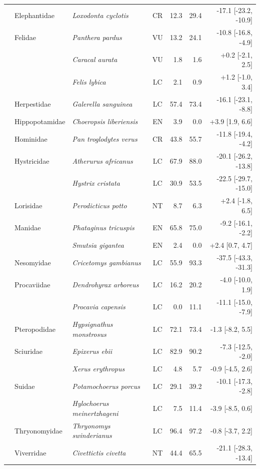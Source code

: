 \begin{tabular}{lllcrrr}
 & Elephantidae & \textit{Loxodonta cyclotis} & CR & 12.3 & 29.4 & -17.1 [-23.2, -10.9] \\
 & Felidae & \textit{Panthera pardus} & VU & 13.2 & 24.1 & -10.8 [-16.8, -4.9] \\
 &  & \textit{Caracal aurata} & VU & 1.8 & 1.6 & +0.2 [-2.1, 2.5] \\
 &  & \textit{Felis lybica} & LC & 2.1 & 0.9 & +1.2 [-1.0, 3.4] \\
 & Herpestidae & \textit{Galerella sanguinea} & LC & 57.4 & 73.4 & -16.1 [-23.1, -8.8] \\
 & Hippopotamidae & \textit{Choeropsis liberiensis} & EN & 3.9 & 0.0 & +3.9 [1.9, 6.6] \\
 & Hominidae & \textit{Pan troglodytes verus} & CR & 43.8 & 55.7 & -11.8 [-19.4, -4.2] \\
 & Hystricidae & \textit{Atherurus africanus} & LC & 67.9 & 88.0 & -20.1 [-26.2, -13.8] \\
 &  & \textit{Hystrix cristata} & LC & 30.9 & 53.5 & -22.5 [-29.7, -15.0] \\
 & Lorisidae & \textit{Perodicticus potto} & NT & 8.7 & 6.3 & +2.4 [-1.8, 6.5] \\
 & Manidae & \textit{Phataginus tricuspis} & EN & 65.8 & 75.0 & -9.2 [-16.1, -2.2] \\
 &  & \textit{Smutsia gigantea} & EN & 2.4 & 0.0 & +2.4 [0.7, 4.7] \\
 & Nesomyidae & \textit{Cricetomys gambianus} & LC & 55.9 & 93.3 & -37.5 [-43.3, -31.3] \\
 & Procaviidae & \textit{Dendrohyrax arboreus} & LC & 16.2 & 20.2 & -4.0 [-10.0, 1.9] \\
 &  & \textit{Procavia capensis} & LC & 0.0 & 11.1 & -11.1 [-15.0, -7.9] \\
 & Pteropodidae & \textit{Hypsignathus monstrosus} & LC & 72.1 & 73.4 & -1.3 [-8.2, 5.5] \\
 & Sciuridae & \textit{Epixerus ebii} & LC & 82.9 & 90.2 & -7.3 [-12.5, -2.0] \\
 &  & \textit{Xerus erythropus} & LC & 4.8 & 5.7 & -0.9 [-4.5, 2.6] \\
 & Suidae & \textit{Potamochoerus porcus} & LC & 29.1 & 39.2 & -10.1 [-17.3, -2.8] \\
 &  & \textit{Hylochoerus meinertzhageni} & LC & 7.5 & 11.4 & -3.9 [-8.5, 0.6] \\
 & Thryonomyidae & \textit{Thryonomys swinderianus} & LC & 96.4 & 97.2 & -0.8 [-3.7, 2.2] \\
 & Viverridae & \textit{Civettictis civetta} & NT & 44.4 & 65.5 & -21.1 [-28.3, -13.4] \\

\end{tabular}
